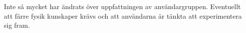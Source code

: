 Inte så mycket har ändrats över uppfattningen av användargruppen.
Eventuellt att färre fysik kunskaper krävs och att användarna
är tänkta att experimentera sig fram.

